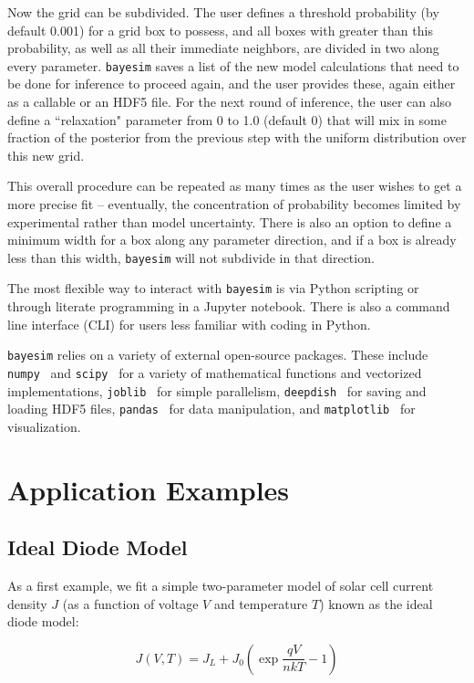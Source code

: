 \documentclass[aps,prl,amsmath,amssymb,superscriptaddress,notitlepage,groupedaddress]{revtex4-1}
\begin{document}
  Now the grid can be subdivided. The user defines a threshold probability (by default 0.001) for a grid box to possess, and all boxes with greater than this probability, as well as all their immediate neighbors, are divided in two along every parameter. \texttt{bayesim} saves a list of the new model calculations that need to be done for inference to proceed again, and the user provides these, again either as a callable or an HDF5 file. For the next round of inference, the user can also define a ``relaxation" parameter from 0 to 1.0 (default 0) that will mix in some fraction of the posterior from the previous step with the uniform distribution over this new grid.

  This overall procedure can be repeated as many times as the user wishes to get a more precise fit -- eventually, the concentration of probability becomes limited by experimental rather than model uncertainty. There is also an option to define a minimum width for a box along any parameter direction, and if a box is already less than this width, \texttt{bayesim} will not subdivide in that direction.

  The most flexible way to interact with \texttt{bayesim} is via Python scripting or through literate programming in a Jupyter notebook. There is also a command line interface (CLI) for users less familiar with coding in Python.

  \texttt{bayesim} relies on a variety of external open-source packages. These include \texttt{numpy}~\cite{numpy} and \texttt{scipy}~\cite{scipy} for a variety of mathematical functions and vectorized implementations, \texttt{joblib}~\cite{joblib} for simple parallelism, \texttt{deepdish}~\cite{deepdish} for saving and loading HDF5 files, \texttt{pandas}~\cite{pandas} for data manipulation, and \texttt{matplotlib}~\cite{mpl} for visualization.

\section*{Application Examples}
  \subsection{Ideal Diode Model}
    As a first example, we fit a simple two-parameter model of solar cell current density $J$ (as a function of voltage $V$ and temperature $T$) known as the ideal diode model:

    \begin{equation}
      J(V,T) = J_L+J_0\left(\exp{\frac{qV}{nkT}}-1\right)
      \label{ID_eqn}
    \end{equation}
\end{document}
